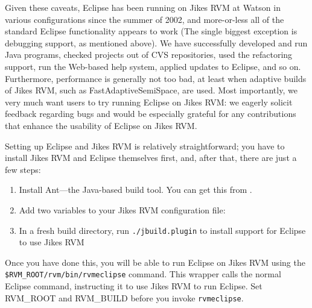 Given these caveats, Eclipse has been running on Jikes RVM at
Watson in various configurations since the summer of 2002, and
more-or-less all of the standard Eclipse functionality appears to work
(The single biggest exception is debugging support, as mentioned
above).  We have successfully developed and run Java programs, checked
projects out of CVS repositories, used the refactoring support, run
the Web-based help system, applied updates to Eclipse, and so on.
Furthermore, performance is generally not too bad, at least when
adaptive builds of Jikes RVM, such as FastAdaptiveSemiSpace, 
are used.  Most importantly, we very much
want users to try running Eclipse on Jikes RVM: we eagerly
solicit feedback regarding bugs and would be especially grateful for
any contributions that enhance the usability of Eclipse on Jikes RVM.  

Setting up Eclipse and Jikes RVM is relatively straightforward; you
have to install Jikes RVM and Eclipse themselves first, and, after
that, there are just a few steps:
\begin{enumerate}
\item Install Ant---the Java-based build tool.  You can get this from
\xlink{{\tt \antURL}}{\antURL}. 
\item Add two variables to your Jikes RVM configuration file:
\item In a fresh build directory, run {\tt ./jbuild.plugin} to install
support for Eclipse to use Jikes RVM
\end{enumerate}

 Once you have done this, you will be able to run Eclipse on Jikes RVM
using the {\tt \$RVM\_ROOT/rvm/bin/rvmeclipse} command.  This wrapper
calls the normal Eclipse command, instructing it to use Jikes RVM to
run Eclipse.  Set RVM\_ROOT and RVM\_BUILD before you
invoke {\tt rvmeclipse}.
